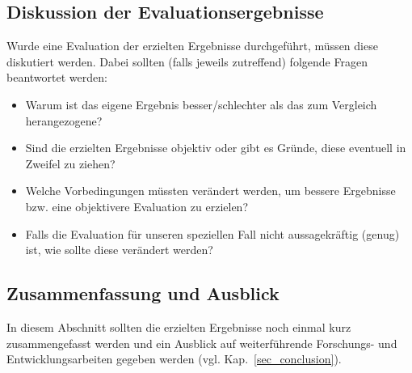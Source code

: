 \subsection{Diskussion der Evaluationsergebnisse}
Wurde eine Evaluation der erzielten Ergebnisse durchgeführt, müssen diese diskutiert werden.
Dabei sollten (falls jeweils zutreffend) folgende Fragen beantwortet werden:
\begin{itemize}
\item Warum ist das eigene Ergebnis besser/schlechter als das zum Vergleich herangezogene?
\item Sind die erzielten Ergebnisse objektiv oder gibt es Gründe, diese eventuell in Zweifel zu ziehen?
\item Welche Vorbedingungen müssten verändert werden, um bessere Ergebnisse bzw. eine objektivere Evaluation zu erzielen?
\item Falls die Evaluation für unseren speziellen Fall nicht aussagekräftig (genug) ist, wie sollte diese verändert werden?
\end{itemize}


\subsection{Zusammenfassung und Ausblick}

In diesem Abschnitt sollten die erzielten Ergebnisse noch einmal kurz zusammengefasst werden und ein Ausblick auf weiterführende Forschungs- und Entwicklungsarbeiten gegeben werden (vgl. Kap.~\ref{sec_conclusion}).